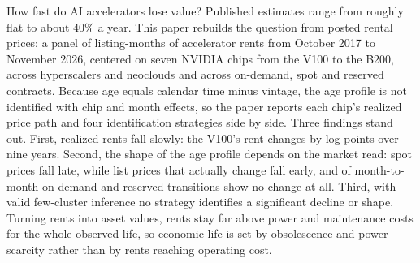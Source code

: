 How fast do AI accelerators lose value? Published estimates range from roughly flat to about 40\% a
year. This paper rebuilds the question from posted rental prices: a panel of \nPanelRows{}
listing-months of accelerator rents from October 2017 to November 2026, centered on seven NVIDIA
chips from the V100 to the B200, across hyperscalers and neoclouds and across on-demand, spot and
reserved contracts. Because age equals calendar time
minus vintage, the age profile is not identified with chip and month effects, so the paper
reports each chip's realized price path and four identification strategies side by side. Three
findings stand out. First, realized rents fall slowly: the V100's rent changes by \nPathVHundredNine{}
log points over nine years. Second, the shape of the age profile depends on
the market read: spot prices fall late, while list prices that actually change fall early, and
\nListUnchanged{} of month-to-month on-demand and reserved transitions show no change at all.
Third, with valid few-cluster inference no strategy identifies a significant decline or shape.
Turning rents into asset values, rents stay far above power and maintenance costs for the whole
observed life, so economic life is set by obsolescence and power scarcity rather than by rents
reaching operating cost. 
